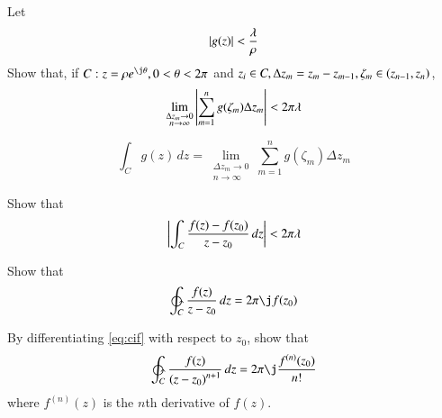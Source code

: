 \documentclass[journal,12pt,twocolumn]{IEEEtran}
\begin{document}
\begin{problem}
Let 
\begin{equation}
\left\vert g(z)\right\vert < \frac{\lambda}{\rho}
\end{equation}
Show that, if $C:z = \rho e^{\j\theta}, 0 < \theta < 2\pi$ and $z_i \in C, \Delta z_m = z_m - z_{m-1}, \zeta_m \in \left(z_{n-1},z_{n}\right)$,
\begin{equation}
\lim_{\substack{\Delta z_m \to 0 \\ n \to \infty}}\left\vert\sum_{m=1}^{n}g(\zeta_m)\Delta z_m\right\vert < 2\pi\lambda
\end{equation}
\end{problem}
\begin{definition}
\begin{equation}
\label{eq:line_int_def}
\int_C g(z)\,dz = \lim_{\substack{\Delta z_m \to 0 \\ n \to \infty}}\sum_{m=1}^{n}g(\zeta_m)\Delta z_m
\end{equation}
\end{definition}
\begin{problem}
Show that 
\begin{equation}
\left\vert\int_C \frac{f(z)-f(z_0)}{z-z_0}\,dz\right\vert < 2\pi\lambda
\end{equation}
%
\end{problem}
\begin{problem}
Show that
\begin{equation}
\label{eq:cif}
\ointctrclockwise_C \frac{f(z)}{z-z_0}\,dz =  2\pi \j f(z_0)
\end{equation}
\end{problem}
\begin{problem}
By differentiating \eqref{eq:cif} with respect to $z_0$, show that
\begin{equation}
\ointctrclockwise_C \frac{f(z)}{\brak{z-z_0}^{n+1}}\,dz =  2\pi \j\frac{f^{(n)}(z_0)}{n!} 
\end{equation}
where $f^{(n)}(z)$ is the $n$th derivative of $f(z)$.
\end{problem}
\end{document}
